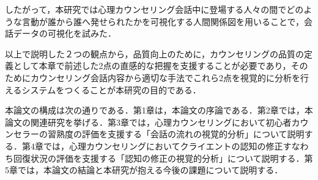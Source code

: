 \documentclass[shuuron]{kuee}
\begin{document}


したがって，本研究では心理カウンセリング会話中に登場する人々の間でどのような言動が誰から誰へ発せられたかを可視化する人間関係図を用いることで，会話データの可視化を試みた．

以上で説明した２つの観点から，品質向上のために，カウンセリングの品質の定義として本章で前述した2点の直感的な把握を支援することが必要であり，そのためにカウンセリング会話内容から適切な手法でこれら2点を視覚的に分析を行えるシステムをつくることが本研究の目的である．

本論文の構成は次の通りである．第1章は，本論文の序論である．第2章では，本論文の関連研究を挙げる．第3章では，心理カウンセリングにおいて初心者カウンセラーの習熟度の評価を支援する「会話の流れの視覚的分析」について説明する．第4章では，心理カウンセリングにおいてクライエントの認知の修正すなわち回復状況の評価を支援する「認知の修正の視覚的分析」について説明する．第5章では，本論文の結論と本研究が抱える今後の課題について説明する．

%
\end{document}
